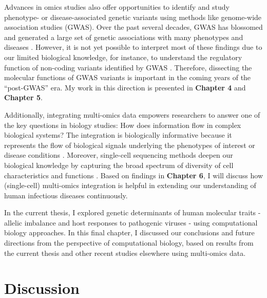 \documentclass{book}
\begin{document}
\begin{refsection}
Advances in omics studies also offer opportunities to identify and study phenotype- or disease-associated genetic variants using methods like genome-wide association studies (GWAS).
Over the past several decades, GWAS has blossomed and generated a large set of genetic associations with many phenotypes and diseases \cite{Buniello2018The}.
However, it is not yet possible to interpret most of these findings due to our limited biological knowledge, for instance, to understand the regulatory function of non-coding variants identified by GWAS \cite{Manolio2013Bringing,Cooper2011Needles}.
Therefore, dissecting the molecular functions of GWAS variants is important in the coming years of the “post-GWAS” era.
My work in this direction is presented in \textbf{Chapter 4} and \textbf{Chapter 5}.

Additionally, integrating multi-omics data empowers researchers to answer one of the key questions in biology studies: How does information flow in complex biological systems? The integration is biologically informative because it represents the flow of biological signals underlying the phenotypes of interest or disease conditions \cite{Tavassoly2018Systems}.
Moreover, single-cell sequencing methods deepen our biological knowledge by capturing the broad spectrum of diversity of cell characteristics and functions \cite{Macaulay2017Single,Packer2018Single}.
Based on findings in \textbf{Chapter 6}, I will discuss how (single-cell) multi-omics integration is helpful in extending our understanding of human infectious diseases continuously.

In the current thesis, I explored genetic determinants of human molecular traits - allelic imbalance and host responses to pathogenic viruses - using computational biology approaches.
In this final chapter, I discussed our conclusions and future directions from the perspective of computational biology, based on results from the current thesis and other recent studies elsewhere using multi-omics data.

\section*{Discussion}


\end{refsection}
\end{document}
